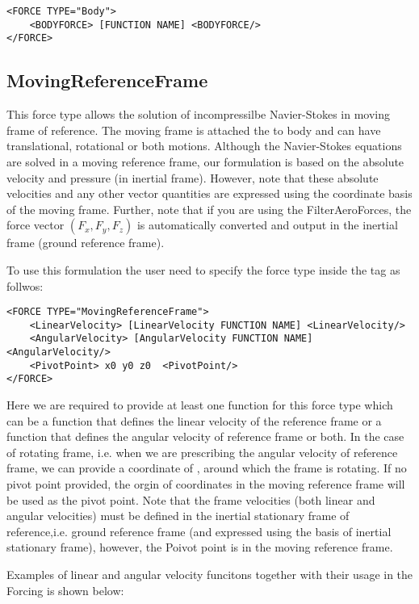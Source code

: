 \begin{lstlisting}[style=XMLStyle] 
<FORCE TYPE="Body">
    <BODYFORCE> [FUNCTION NAME] <BODYFORCE/>
</FORCE>
\end{lstlisting}

\subsection{MovingReferenceFrame}
This force type allows the solution of incompressilbe Navier-Stokes in moving frame of reference. The moving frame is attached the to body and can have translational, rotational or both motions. Although the Navier-Stokes equations are solved in a moving reference frame, our formulation is based on the absolute velocity and pressure (in inertial frame). However, note that these absolute velocities and any other vector quantities are expressed using the coordinate basis of the moving frame. Further, note that if you are using the FilterAeroForces, the force vector $\left(F_x, F_y, F_z\right)$ is automatically converted and output in the inertial frame (ground reference frame).

To use this formulation the user need to specify the force type inside the  tag as follwos:

\begin{lstlisting}[style=XMLStyle]
<FORCE TYPE="MovingReferenceFrame">
    <LinearVelocity> [LinearVelocity FUNCTION NAME] <LinearVelocity/>
    <AngularVelocity> [AngularVelocity FUNCTION NAME] <AngularVelocity/>
    <PivotPoint> x0 y0 z0  <PivotPoint/>
</FORCE>
\end{lstlisting}

Here we are required to provide at least one function for this force type which can be a function that defines the linear velocity of the reference frame or a function that defines the angular velocity of reference frame or both. In the case of rotating frame, i.e. when we are prescribing the angular velocity of reference frame, we can provide a coordinate of , around which the frame is rotating. If no pivot point provided, the orgin of coordinates in the moving reference frame will be used as the pivot point. 
Note that the frame velocities (both linear and angular velocities) must be defined in the inertial stationary frame of reference,i.e. ground reference frame (and expressed using the basis of inertial stationary frame), however, the Poivot point is in the moving reference frame.

Examples of linear and angular velocity funcitons together with their usage in the Forcing is shown below:


